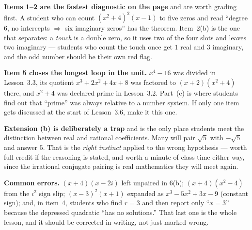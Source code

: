 \documentclass[10pt]{article}
\begin{document}
\begin{teachernote}
\textbf{Items 1--2 are the fastest diagnostic on the page} and are worth grading first. A student who
can count $(x^2+4)^2(x-1)$ to five zeros and read ``degree $6$, no intercepts $\Rightarrow$ six
imaginary zeros'' has the theorem. Item~2(b) is the one that separates: a \emph{touch} is a double
zero, so it uses two of the four slots and leaves two imaginary --- students who count the touch once
get $1$ real and $3$ imaginary, and the odd number should be their own red flag.

\vspace{3pt}
\textbf{Item 5 closes the longest loop in the unit.} $x^4-16$ was divided in Lesson~3.3, its quotient
$x^3+2x^2+4x+8$ was factored to $(x+2)(x^2+4)$ there, and $x^2+4$ was declared prime in Lesson~3.2.
Part~(c) is where students find out that ``prime'' was always relative to a number system. If only
one item gets discussed at the start of Lesson~3.6, make it this one.

\vspace{3pt}
\textbf{Extension (b) is deliberately a trap} and is the only place students meet the distinction
between real and rational coefficients. Many will pair $\sqrt5$ with $-\sqrt5$ and answer $5$. That is
the \emph{right instinct} applied to the wrong hypothesis --- worth full credit if the reasoning is
stated, and worth a minute of class time either way, since the irrational conjugate pairing is real
mathematics they will meet again.

\vspace{3pt}
\textbf{Common errors.} $(x+4)(x-2i)$ left unpaired in 6(b); $(x+4)(x^2-4)$ from the $i^2$ sign slip;
$(x-3)^2(x+1)$ expanded as $x^3-5x^2+3x-9$ (constant sign); and, in item~4, students who find $r=3$
and then report only ``$x=3$'' because the depressed quadratic ``has no solutions.'' That last one is
the whole lesson, and it should be corrected in writing, not just marked wrong.
\end{teachernote}
\end{document}
